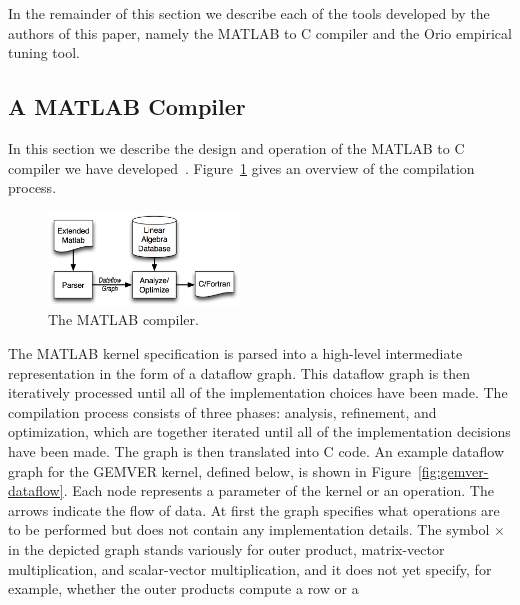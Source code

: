 \documentclass[runningheads]{llncs}
\begin{document}

In the remainder of this section we describe each of the tools developed by the authors of this paper, namely the MATLAB to C compiler and the Orio empirical tuning tool.

\subsection{A MATLAB Compiler}
\label{sec:matlab}
%
In this section we describe the design and operation of the MATLAB to C compiler we have developed~\cite{Siek}.    Figure~\ref{fig:compiler} gives an overview of the compilation process. 
%
\begin{figure}
\vspace{-.2in}
\centering
\includegraphics[width=2in]{figures/compile.png}
\caption{The MATLAB compiler.}
\label{fig:compiler}
\vspace{-.2in}
\end{figure}
The MATLAB kernel specification is parsed into a high-level intermediate
representation in the form of a dataflow graph.  This dataflow graph is then
iteratively processed until all of the implementation choices have been made.
The compilation process consists of three phases: analysis, refinement, and
optimization, which are together iterated until all of the implementation
decisions have been made.  The graph is then translated into C code.
%
An example dataflow graph for the GEMVER kernel, defined below, is shown
in Figure~\ref{fig:gemver-dataflow}.
Each node represents a parameter of the kernel or an operation.  The arrows
indicate the flow of data. At first the graph specifies what operations are
to be performed but does not contain any implementation details. The symbol
$\times$ in the depicted graph stands variously for outer product,
matrix-vector multiplication, and scalar-vector multiplication, and it does
not yet specify, for example, whether the outer products compute a row or a
\end{document}
